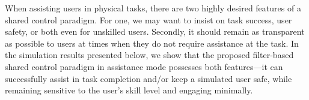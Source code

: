 

When assisting users in physical tasks, there are two highly desired features of a shared control paradigm. For one, we may want to insist on task success, user safety, or both even for unskilled users. Secondly, it should remain as transparent as possible to users at times when they do not require assistance at the task. In the simulation results presented below, we show that the proposed filter-based shared control paradigm in assistance mode possesses both features---it can successfully assist in task completion and/or keep a simulated user safe, while remaining sensitive to the user's skill level and engaging minimally. 

